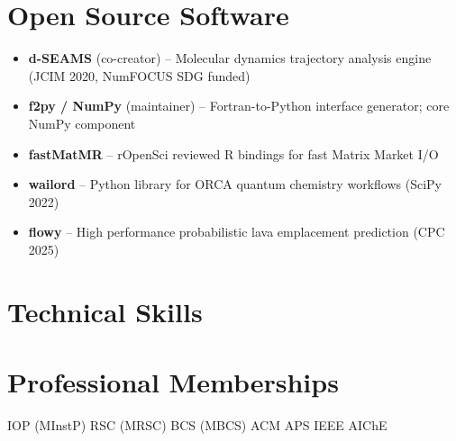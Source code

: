 \documentclass[twopage]{rgcv}
\begin{document}
\section{Open Source Software}
\begin{itemize}
\item \textbf{d-SEAMS} (co-creator) -- Molecular dynamics trajectory analysis engine (JCIM 2020, NumFOCUS SDG funded)
\item \textbf{f2py / NumPy} (maintainer) -- Fortran-to-Python interface generator; core NumPy component
\item \textbf{fastMatMR} -- rOpenSci reviewed R bindings for fast Matrix Market I/O
\item \textbf{wailord} -- Python library for ORCA quantum chemistry workflows (SciPy 2022)
\item \textbf{flowy} -- High performance probabilistic lava emplacement prediction (CPC 2025)
\end{itemize}
\section{Technical Skills}

\section{Professional Memberships}
IOP (MInstP) \textbullet{} RSC (MRSC) \textbullet{} BCS (MBCS) \textbullet{} ACM \textbullet{} APS \textbullet{} IEEE \textbullet{} AIChE
\end{document}
